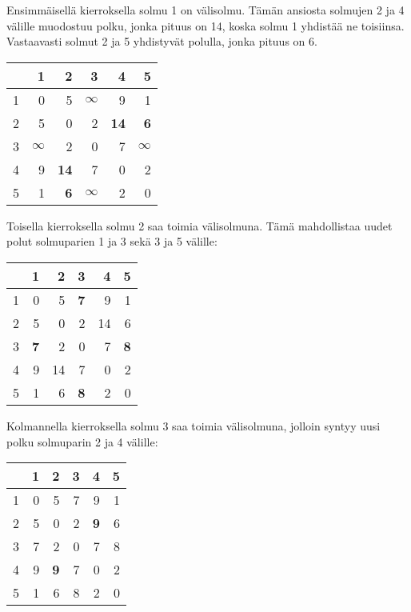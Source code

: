 Ensimmäisellä kierroksella solmu 1 on välisolmu.
Tämän ansiosta solmujen 2 ja 4 välille muodostuu
polku, jonka pituus on 14,
koska solmu 1 yhdistää ne toisiinsa.
Vastaavasti solmut 2 ja 5 yhdistyvät polulla,
jonka pituus on 6.

\begin{center}
\begin{tabular}{r|rrrrr}
 & 1 & 2 & 3 & 4 & 5 \\
\hline
1 & 0 & 5 & $\infty$ & 9 & 1 \\
2 & 5 & 0 & 2 & \textbf{14} & \textbf{6} \\
3 & $\infty$ & 2 & 0 & 7 & $\infty$ \\
4 & 9 & \textbf{14} & 7 & 0 & 2 \\
5 & 1 & \textbf{6} & $\infty$ & 2 & 0 \\
\end{tabular}
\end{center}
\vspace{10pt}

Toisella kierroksella solmu 2 saa toimia välisolmuna.
Tämä mahdollistaa uudet polut solmuparien 1 ja 3
sekä 3 ja 5 välille:

\begin{center}
\begin{tabular}{r|rrrrr}
 & 1 & 2 & 3 & 4 & 5 \\
\hline
1 & 0 & 5 & \textbf{7} & 9 & 1 \\
2 & 5 & 0 & 2 & 14 & 6 \\
3 & \textbf{7} & 2 & 0 & 7 & \textbf{8} \\
4 & 9 & 14 & 7 & 0 & 2 \\
5 & 1 & 6 & \textbf{8} & 2 & 0 \\
\end{tabular}
\end{center}
\vspace{10pt}

Kolmannella kierroksella solmu 3 saa toimia välisolmuna,
jolloin syntyy uusi polku solmuparin 2 ja 4 välille:

\begin{center}
\begin{tabular}{r|rrrrr}
 & 1 & 2 & 3 & 4 & 5 \\
\hline
1 & 0 & 5 & 7 & 9 & 1 \\
2 & 5 & 0 & 2 & \textbf{9} & 6 \\
3 & 7 & 2 & 0 & 7 & 8 \\
4 & 9 & \textbf{9} & 7 & 0 & 2 \\
5 & 1 & 6 & 8 & 2 & 0 \\
\end{tabular}
\end{center}
\vspace{10pt}


